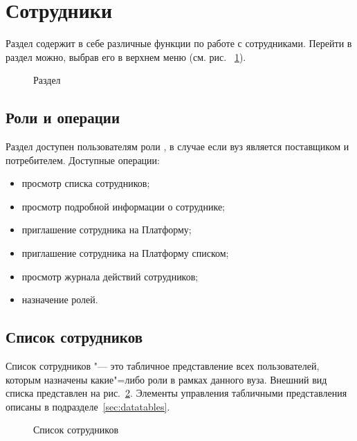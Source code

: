 \graphicspath{ {images/employee/} }
\section{Сотрудники}
Раздел  содержит в себе различные функции по работе с сотрудниками. 
Перейти в раздел можно, выбрав его в верхнем меню (см. рис. ~\ref{img:employee:top_menu}).

\begin{figure}[H]
	\caption{Раздел }
	\label{img:employee:top_menu}
\end{figure}


\subsection{Роли и операции}
Раздел доступен пользователям роли , в случае если вуз является поставщиком и потребителем. Доступные операции:
\begin{itemize}
	\item просмотр списка сотрудников;
	\item просмотр подробной информации о сотруднике;
	\item приглашение сотрудника на Платформу;
	\item приглашение сотрудника на Платформу списком;
	\item просмотр журнала действий сотрудников;
	\item назначение ролей.
\end{itemize}

\subsection{Список сотрудников}
Список сотрудников "--- это табличное представление всех пользователей, которым назначены какие"=либо роли в рамках 
данного вуза. Внешний вид списка представлен на рис.~\ref{img:employee:employee_list}.
Элементы управления табличными представления описаны в подразделе~\ref{sec:datatables}.

\begin{figure}[H]
	\caption{Список сотрудников}
	\label{img:employee:employee_list}
\end{figure}


